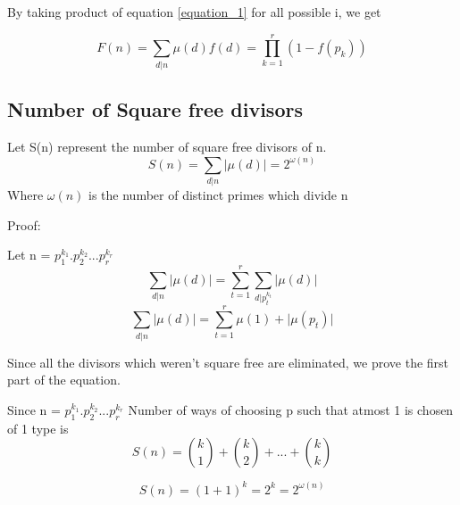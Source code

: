 \documentclass{article}
\begin{document}
By taking product of equation \ref{equation_1} for all possible i, we get

\[
    F(n) = \sum_{d\vert n}\mu(d)f(d) = \prod_{k=1}^{r} (1 - f(p_k))
\]

\subsection{Number of Square free divisors}

Let S(n) represent the number of square free divisors of n.
\[
    S(n) = \sum_{d\vert n } \mathopen|\mu(d)\mathclose| = 2^{\omega(n)}
\]
Where \(\omega(n)\) is the number of distinct primes which divide n

Proof:

Let n = \(p_1^{k_1} . p_2^{k_2} . . . p_r^{k_r}\)
\[\sum_{d\vert n} \mathopen|\mu(d)\mathclose| = \sum_{t = 1}^r\sum_{d\vert p_t^{k_t}} \mathopen|\mu(d)\mathclose|\]
\[
    \sum_{d\vert n} \mathopen|\mu(d)\mathclose| = \sum_{t = 1}^r\mu(1) + \mathopen|\mu(p_t)\mathclose|
\]


Since all the divisors which weren't square free are eliminated, we prove \indent the first part of the equation.

Since n = \(p_1^{k_1} . p_2^{k_2} . . . p_r^{k_r}\)
Number of ways of choosing p such that atmost 1 is \indent chosen of 1 type is
\[
    S(n) = \binom{k}{1} + \binom{k}{2} + . . . + \binom{k}{k}
\]

\[
    S(n) = ( 1 + 1 )^k = 2^k = 2^{\omega(n)}
\]
\end{document}
